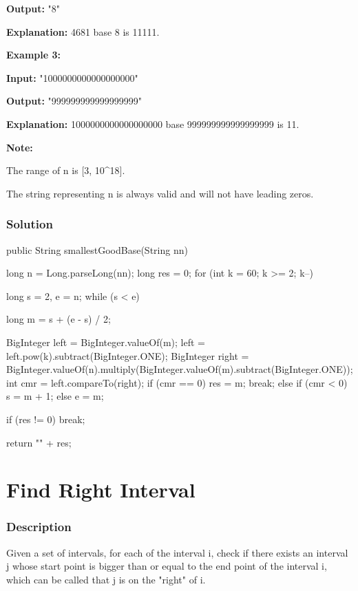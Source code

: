 \textbf{Output:} "8"

\textbf{Explanation:} 4681 base 8 is 11111.

\textbf{Example 3:}

\textbf{Input:} "1000000000000000000"

\textbf{Output:} "999999999999999999"

\textbf{Explanation:} 1000000000000000000 base 999999999999999999 is 11.

\textbf{Note:}

The range of n is [3, 10^18].

The string representing n is always valid and will not have leading zeros.
\subsubsection{Solution}

\begin{Code}
public String smallestGoodBase(String nn) {
    long n = Long.parseLong(nn);
    long res = 0;
    for (int k = 60; k >= 2; k--) {
        long s = 2, e = n;
        while (s < e) {
            long m = s + (e - s) / 2;

            BigInteger left = BigInteger.valueOf(m);
            left = left.pow(k).subtract(BigInteger.ONE);
            BigInteger right = BigInteger.valueOf(n).multiply(BigInteger.valueOf(m).subtract(BigInteger.ONE));
            int cmr = left.compareTo(right);
            if (cmr == 0) {
                res = m;
                break;
            } else if (cmr < 0) {
                s = m + 1;
            } else {
                e = m;
            }
        }

        if (res != 0) break;
    }

    return "" + res;
}
\end{Code}

\newpage

\section{Find Right Interval} %

\subsubsection{Description}
Given a set of intervals, for each of the interval i, check if there exists an interval j whose start point is bigger than or equal to the end point of the interval i, which can be called that j is on the "right" of i.

